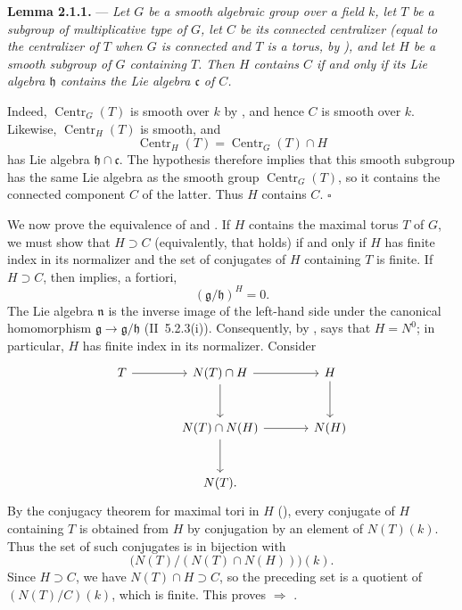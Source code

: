 \medskip
\noindent{}\textbf{Lemma 2.1.1.} ---
\textit{Let \(G\) be a smooth algebraic group over a field \(k\), let
\(T\) be a subgroup of multiplicative type of \(G\), let \(C\) be its
connected centralizer (equal to the centralizer of \(T\) when \(G\)
is connected and \(T\) is a torus, by ), and let \(H\) be
a smooth subgroup of \(G\) containing \(T\). Then \(H\) contains
\(C\) if and only if its Lie algebra \(\mathfrak h\) contains the Lie
algebra \(\mathfrak c\) of \(C\).}

Indeed, \(\operatorname{Centr}_G(T)\) is smooth over \(k\) by ,
and hence \(C\) is smooth over \(k\). Likewise,
\(\operatorname{Centr}_H(T)\) is smooth, and
\[
  \operatorname{Centr}_H(T)=\operatorname{Centr}_G(T)\cap H
\]
has Lie algebra \(\mathfrak h\cap\mathfrak c\). The hypothesis
therefore implies that this smooth subgroup has the same Lie algebra
as the smooth group \(\operatorname{Centr}_G(T)\), so it contains the
connected component \(C\) of the latter. Thus \(H\) contains \(C\).
\hfill\(\square\)

We now prove the equivalence of  and . If \(H\) contains the
maximal torus \(T\) of \(G\), we must show that \(H\supset C\)
(equivalently, that  holds) if and only if \(H\) has finite index
in its normalizer and the set of conjugates of \(H\) containing \(T\)
is finite. If \(H\supset C\), then  implies, a fortiori,
\[
\tag{xx}
  (\mathfrak g/\mathfrak h)^H=0.
\]
The Lie algebra \(\mathfrak n\) is the inverse image of the left-hand
side under the canonical homomorphism
\(\mathfrak g\to\mathfrak g/\mathfrak h\) (II~5.2.3(i)).
Consequently, by ,  says that \(H=N^0\); in particular, \(H\)
has finite index in its normalizer. Consider 
\[
\begin{tikzcd}[column sep=large,row sep=large]
T \arrow[r] &
N(T)\cap H \arrow[r] \arrow[d] &
H \arrow[d] \\
{} &
N(T)\cap N(H) \arrow[r] \arrow[d] &
N(H) \\
{} &
N(T). &
\end{tikzcd}
\]
By the conjugacy theorem for maximal tori in \(H\) (),
every conjugate of \(H\) containing \(T\) is obtained from \(H\) by
conjugation by an element of \(N(T)(k)\). Thus the set of such
conjugates is in bijection with
\[
  \bigl(N(T)/(N(T)\cap N(H))\bigr)(k).
\]
Since \(H\supset C\), we have \(N(T)\cap H\supset C\), so the
preceding set is a quotient of \((N(T)/C)(k)\), which is finite.
This proves  \(\Rightarrow\) .

